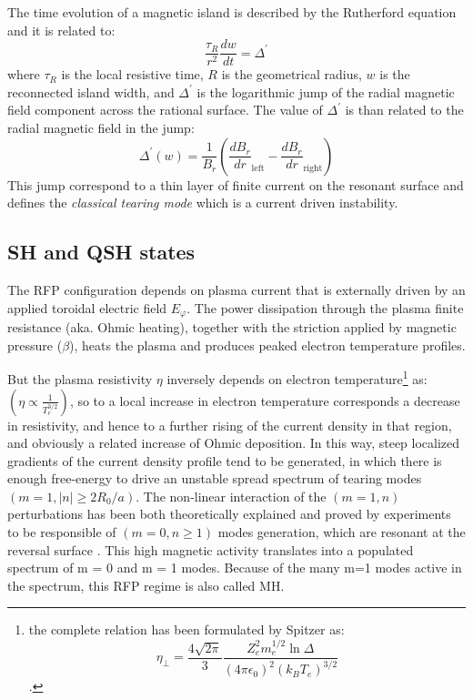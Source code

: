 The time evolution of a magnetic island is described by the Rutherford equation and it is related to:
\begin{equation}
    \frac{\tau_R}{r^2} \frac{dw}{dt} = \Delta^\prime
\end{equation}
%
where $\tau_R$ is the local resistive time, $R$ is the geometrical radius, $w$ is the reconnected island width, and $\Delta^\prime$ is the logarithmic jump of the radial magnetic field component across the rational surface.
%
The value of $\Delta^\prime$ is than related to the radial magnetic field in the jump:
\begin{equation}
    \Delta^\prime (w) = \frac{1}{B_r} \left( \frac{dB_r}{dr}_\text{left} - \frac{dB_r}{dr}_\text{right} \right)
\end{equation}
%	
This jump correspond to a thin layer of finite current on the resonant surface and defines the \emph{classical tearing mode} which is a current driven instability.

\subsection{SH and QSH states}

The RFP configuration depends on plasma current that is externally driven by an applied toroidal electric field $E_\varphi$. 
The power dissipation through the plasma finite resistance (aka. Ohmic heating), together with the striction applied by magnetic pressure ($\beta$), heats the plasma and produces peaked electron temperature profiles. 

But the plasma resistivity $\eta$ inversely depends on electron temperature\footnote{the complete relation has been formulated by Spitzer as: $$\eta_\bot  = \frac{4\sqrt{2\pi}}{3} \frac{Z_e^2 m_e^{1/2} \ln{\Delta}}{(4\pi\epsilon_0)^2(k_B T_e)^{3/2}} $$.}
as: $(\eta \propto \frac{1}{T_e^{3/2}})$, so to a local increase in electron temperature corresponds a decrease in resistivity, and hence to a further rising of the current density in that region, and obviously a related increase of Ohmic deposition. In this way, steep localized gradients of the current density profile tend to be generated, in which there is enough free-energy to drive an unstable spread spectrum of tearing modes $(m = 1, |n| \geq 2R_0 /a)$. The non-linear interaction of the $(m = 1, n)$ perturbations has been both theoretically explained and proved by experiments to be responsible of $(m = 0, n \geq 1)$ modes generation, which are resonant at the reversal surface \cite{Bonomo33}. This high magnetic activity translates into a populated spectrum of m = 0 and m = 1 modes.
Because of the many m=1 modes active in the spectrum, this RFP regime is also called \acl{MH}.

